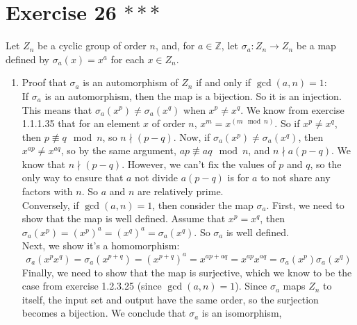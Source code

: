 \documentclass[12pt]{article}
\newcommand{\Z}{\mathbb{Z}}
\begin{document}
    \section*{Exercise 26 $***$}
    Let $Z_n$ be a cyclic group of order $n$, and, for $a \in \Z$,
    let $\sigma_a: Z_n \to Z_n$ be a map
    defined by $\sigma_a(x) = x^a$ for each $x \in Z_n$. \\
    \begin{enumerate}[label=\textbf{\alph*.}]
        \item 
            Proof that $\sigma_a$ is an automorphism of $Z_n$
            if and only if $\gcd(a, n) = 1$: \\
            If $\sigma_a$ is an automorphism,
            then the map is a bijection.
            So it is an injection.
            This means that $\sigma_a(x^p) \neq \sigma_a(x^q)$
            when $x^p \neq x^q$.
            We know from exercise 1.1.1.35 that for an element $x$ of
            order $n$, $x^m = x^{(m \mod n)}$.
            So if $x^p \neq x^q$, then $p \not\equiv q \mod n$,
            so $n \nmid (p - q)$.
            Now, if $\sigma_a(x^p) \neq \sigma_a(x^q)$,
            then $x^{ap} \neq x^{aq}$,
            so by the same argument, $ap \not\equiv aq \mod n$,
            and $n \nmid a(p - q)$.
            We know that $n \nmid (p-q)$.
            However, we can't fix the values of $p$ and $q$,
            so the only way to ensure that $a$ not divide $a(p - q)$
            is for $a$ to not share any factors with $n$.
            So $a$ and $n$ are relatively prime. \\
            Conversely, if $\gcd(a, n) = 1$,
            then consider the map $\sigma_a$.
            First, we need to show that the map is well defined.
            Assume that $x^p = x^q$,
            then $\sigma_a(x^p) = (x^p)^a = (x^q)^a = \sigma_a(x^q)$.
            So $\sigma_a$ is well defined. \\
            Next, we show it's a homomorphism:
            \[ \sigma_a(x^px^q) = \sigma_a(x^{p + q})
            = (x^{p + q})^a
            = x^{ap + aq}
            = x^{ap}x^{aq}
            = \sigma_a(x^p)\sigma_a(x^q) \]
            Finally, we need to show that the map is surjective,
            which we know to be the case from
            exercise 1.2.3.25 (since $\gcd(a, n) = 1$).
            Since $\sigma_a$ maps $Z_n$ to itself,
            the input set and output have the same order,
            so the surjection becomes a bijection.
            We conclude that $\sigma_a$ is an isomorphism,

\end{enumerate}
\end{document}
